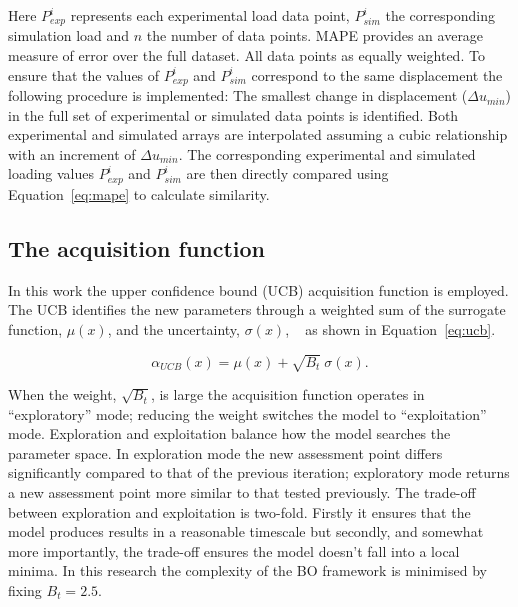 \documentclass[preprint, review, 12pt]{elsarticle}
\begin{document}
	Here $P^i_{exp}$ represents each experimental load data point, $P_{sim}^i$ the corresponding simulation load and $n$ the number of data points.
	MAPE provides an average measure of error over the full dataset.
	All data points as equally weighted.
	To ensure that the values of $P_{exp}^i$ and $P_{sim}^i$ correspond to the same displacement the following procedure is implemented:
	The smallest change in displacement ($\Delta u_{min}$) in the full set of experimental or simulated data points is identified.
	Both experimental and simulated arrays are interpolated assuming a cubic relationship with an increment of $\Delta u_{min}$.
	The corresponding experimental and simulated loading values $P^i_{exp}$ and $P^i_{sim}$ are then directly compared using Equation~\ref{eq:mape} to calculate similarity.

	\subsection{The acquisition function}
	\label{h:acquisition_function}

	In this work the upper confidence bound (UCB) acquisition function is employed.
	The UCB identifies the new parameters through a weighted sum of the surrogate function, $\mu \left(x \right)$, and the uncertainty, $\sigma \left(x \right)$, ~\cite{SHAHRIARI2016, DEATH2021} as shown in Equation~\ref{eq:ucb}.

		\begin{equation}
		\alpha_{UCB} \left( x \right) = \mu \left( x \right) + \sqrt{B_t} \: \sigma\left( x \right).
		\label{eq:ucb}
		\end{equation}

	When the weight, $\sqrt{B_t}$, is large the acquisition function operates in ``exploratory'' mode; reducing the weight switches the model to ``exploitation'' mode.
	Exploration and exploitation balance how the model searches the parameter space.
	In exploration mode the new assessment point differs significantly compared to that of the previous iteration; exploratory mode returns a new assessment point more similar to that tested previously.
	The trade-off between exploration and exploitation is two-fold.
	Firstly it ensures that the model produces results in a reasonable timescale but secondly, and somewhat more importantly, the trade-off ensures the model doesn't fall into a local minima.
	In this research the complexity of the BO framework is minimised by fixing $B_t=2.5$.
\end{document}
